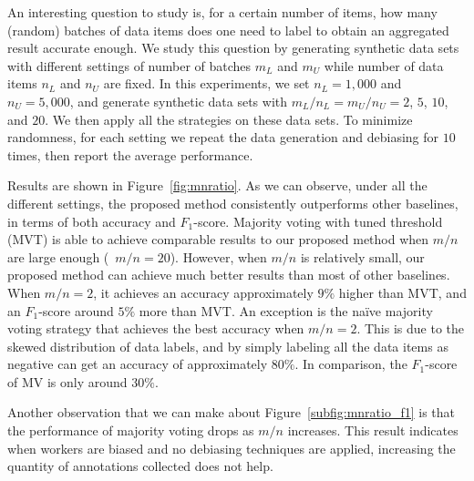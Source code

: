 An interesting question to study is, 
for a certain number of items, how many (random) batches of data items 
does one need to label to obtain an aggregated result accurate enough.
We study this question by generating synthetic data sets 
with different settings of number of batches $m_L$ and $m_U$ while number of data items $n_L$ and $n_U$ are fixed.  
In this experiments, we set $n_L=1,000$ and $n_U=5,000$, 
and generate synthetic data sets with $m_L/n_L=m_U/n_U=2$, $5$, $10$, and $20$.  
We then apply all the strategies on these data sets.  
To minimize randomness, for each setting we repeat the data generation and debiasing for $10$ times, 
then report the average performance.  

Results are shown in Figure~\ref{fig:mnratio}.  
As we can observe, under all the different settings, 
the proposed method consistently outperforms other baselines, 
in terms of both accuracy and $F_1$-score. 
Majority voting with tuned threshold (MVT) 
is able to achieve comparable results to our proposed method 
when $m/n$ are large enough (\eg~$m/n=20$).
However, when $m/n$ is relatively small, 
our proposed method can achieve much better results than most of other baselines.  
When $m/n=2$, it achieves an accuracy approximately $9\%$ higher than MVT, 
and an $F_1$-score around $5\%$ more than MVT.  
An exception is the na\"{i}ve majority voting strategy 
that achieves the best accuracy when $m/n=2$.  
This is due to the skewed distribution of data labels, 
and by simply labeling all the data items as negative can get an accuracy of approximately $80\%$.  
In comparison, the $F_1$-score of MV is only around $30\%$.  

Another observation that we can make about Figure~\ref{subfig:mnratio_f1} 
is that the performance of majority voting drops as $m/n$ increases. 
This result indicates when workers are biased and no debiasing techniques are applied, 
increasing the quantity of annotations collected does not help. 




